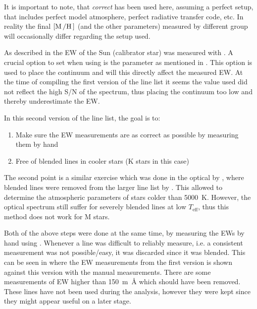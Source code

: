 It is important to note, that \emph{correct} has been used here, assuming a perfect setup, that
includes perfect model atmosphere, perfect radiative transfer code, etc. In reality the final
$[\ion{M}/\ion{H}]$ (and the other parameters) measured by different group will occasionally differ
regarding the setup used.

As described in  the EW of the Sun (calibrator star) was measured with
\ARES. A crucial option to set when using \ARES is the  parameter as mentioned in
. This option is used to place the continuum and will this directly affect the
measured EW. At the time of compiling the first version of the line list it seems the 
value used did not reflect the high S/N of the spectrum, thus placing the continuum too low and
thereby underestimate the EW.

In this second version of the line list, the goal is to:
\begin{enumerate}
  \item Make sure the EW measurements are as correct as possible by measuring them by hand
  \item Free of blended lines in cooler stars (K stars in this case)
\end{enumerate}
The second point is a similar exercise which was done in the optical by \citet{Tsantaki2013}, where
blended lines were removed from the larger line list by \citet{Sousa2008a}. This allowed to
determine the atmospheric parameters of stars colder than \SI{5000}{K}. However, the optical
spectrum still suffer for severely blended lines at low $T_\mathrm{eff}$, thus this method does not
work for M stars.

Both of the above steps were done at the same time, by measuring the EWs by hand using .
Whenever a line was difficult to reliably measure, i.e. a consistent measurement was not
possible/easy, it was discarded since it was blended. This can be seen in
 where the EW measurements from the first version is shown against
this version with the manual measurements. There are some measurements of EW higher than
\SI{150}{m\angstrom} which should have been removed. These lines have not been used during the
analysis, however they were kept since they might appear useful on a later stage.

